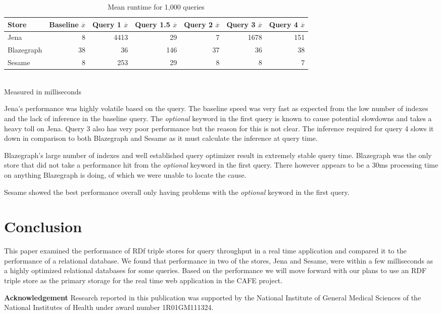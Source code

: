 \documentclass{llncs}
\begin{document}
\begin{table}
\begin{center}
\caption{Mean runtime for 1,000 queries}
\begin{tabular}{l | r | r | r | r | r | r}
    Store & Baseline $\overline{x}$ & Query 1 $\overline{x}$ & Query 1.5 $\overline{x}$ & Query 2 $\overline{x}$ & Query 3 $\overline{x}$ & Query 4 $\overline{x}$ \\
\hline
Jena & 8 & 4413 & 29 & 7 & 1678 & 151 \\
Blazegraph & 38 & 36 & 146 & 37 & 36 & 38 \\
Sesame & 8 & 253 & 29 & 8 & 8 & 7
\end{tabular}
\\[5pt]
Measured in milliseconds
\end{center}
\end{table}

Jena's performance was highly volatile based on the query.  The baseline speed was very fast as expected from the low number of indexes and the lack of inference in the baseline query.  The \emph{optional} keyword in the first query is known to cause potential slowdowns and takes a heavy toll on Jena.  Query 3 also has very poor performance but the reason for this is not clear.  The inference required for query 4 slows it down in comparison to both Blazegraph and Sesame as it must calculate the inference at query time.

Blazegraph's large number of indexes and well established query optimizer result in extremely stable query time.  Blazegraph was the only store that did not take a performance hit from the \emph{optional} keyword in the first query.  There however appears to be a 30ms processing time on anything Blazegraph is doing, of which we were unable to locate the cause. 

Sesame showed the best performance overall only having problems with the \emph{optional} keyword in the first query.

\section{Conclusion}
This paper examined the performance of RDf triple stores for query throughput in a real time application and compared it to the performance of a relational database.  We found that performance in two of the stores, Jena and Sesame, were within a few milliseconds as a highly optimized relational databases for some queries.  Based on the performance we will move forward with our plans to use an RDF triple store as the primary storage for the real time web application in the CAFE project.

\medskip
\noindent
\textbf{Acknowledgement} Research reported in this publication was supported by the National Institute of General Medical Sciences of the National Institutes of Health under award number 1R01GM111324.



\end{document}
